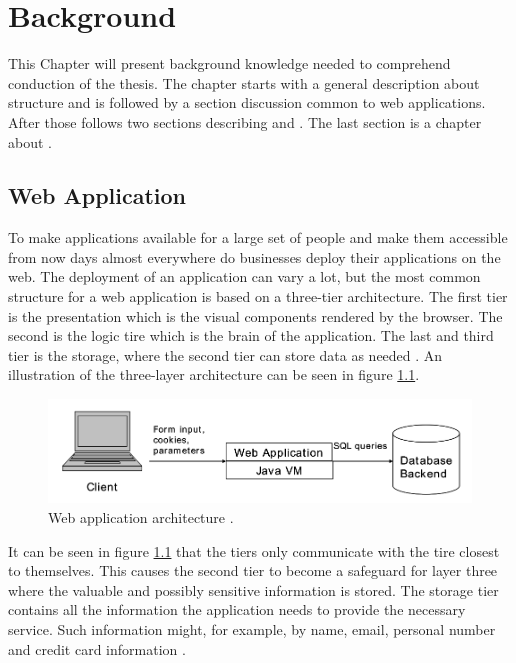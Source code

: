 \chapter{Background}
This Chapter will present background knowledge needed to comprehend conduction of the thesis. The chapter starts with a general description about \textit{} structure and is followed by a section discussion common \textit{} to web applications. After those follows two sections describing \textit{} and \textit{}. The last section is a chapter about \textit{}.


\section{Web Application}
\label{WebApplication}
To make applications available for a large set of people and make them accessible from now days almost everywhere do businesses deploy their applications on the web. The deployment of an application can vary a lot, but the most common structure for a web application is based on a three-tier architecture. The first tier is the presentation which is the visual components rendered by the browser. The second is the logic tire which is the brain of the application. The last and third tier is the storage, where the second tier can store data as needed \parencite{JustinClarke-Salt2009SIAa}. An illustration of the three-layer architecture can be seen in figure \ref{fig:webApplication-Haldar}.

\begin{figure}
    \centering
    \includegraphics[width=\textwidth]{images/webApplication-Haldar.png}
    \caption{Web application architecture \cite{Haldar}.}
    \label{fig:webApplication-Haldar}
\end{figure}

It can be seen in figure \ref{fig:webApplication-Haldar} that the tiers only communicate with the tire closest to themselves. This causes the second tier to become a safeguard for layer three where the valuable and possibly sensitive information is stored. The storage tier contains all the information the application needs to provide the necessary service. Such information might, for example, by name, email, personal number and credit card information \parencite{JustinClarke-Salt2009SIAa}.


